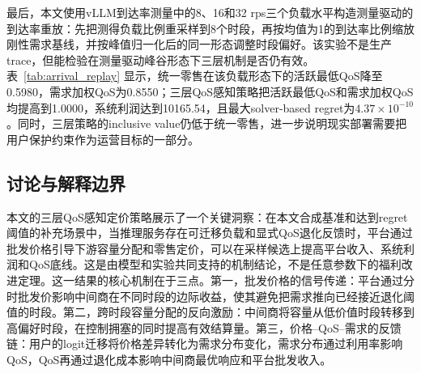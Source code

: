 \documentclass[UTF8,11pt]{ctexart}
\begin{document}
最后，本文使用vLLM到达率测量中的8、16和32 rps三个负载水平构造测量驱动的到达率重放：先把测得负载比例重采样到8个时段，再按均值为1的到达率比例缩放刚性需求基线，并按峰值归一化后的同一形态调整时段偏好。该实验不是生产trace，但能检验在测量驱动峰谷形态下三层机制是否仍有效。表~\ref{tab:arrival_replay} 显示，统一零售在该负载形态下的活跃最低QoS降至0.5980，需求加权QoS为0.8550；三层QoS感知策略把活跃最低QoS和需求加权QoS均提高到1.0000，系统利润达到10165.54，且最大solver-based regret为$4.37\times10^{-10}$。同时，三层策略的inclusive value仍低于统一零售，进一步说明现实部署需要把用户保护约束作为运营目标的一部分。

\begin{table}[H]
\centering
\caption{测量驱动到达率重放实验}
\label{tab:arrival_replay}
\small
{}
\end{table}

\subsection{讨论与解释边界}
\label{sec:discussion}

本文的三层QoS感知定价策略展示了一个关键洞察：在本文合成基准和达到regret阈值的补充场景中，当推理服务存在可迁移负载和显式QoS退化反馈时，平台通过批发价格引导下游容量分配和零售定价，可以在采样候选上提高平台收入、系统利润和QoS底线。这是由模型和实验共同支持的机制结论，不是任意参数下的福利改进定理。这一结果的核心机制在于三点。第一，批发价格的信号传递：平台通过分时批发价影响中间商在不同时段的边际收益，使其避免把需求推向已经接近退化阈值的时段。第二，跨时段容量分配的反向激励：中间商将容量从低价值时段转移到高偏好时段，在控制拥塞的同时提高有效结算量。第三，价格--QoS--需求的反馈链：用户的logit迁移将价格差异转化为需求分布变化，需求分布通过利用率影响QoS，QoS再通过退化成本影响中间商最优响应和平台批发收入。
\end{document}
